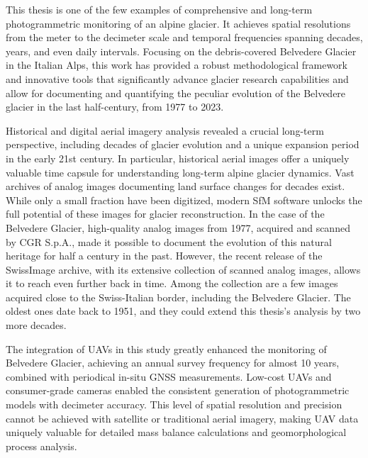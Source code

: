 This thesis is one of the few examples of comprehensive and long-term photogrammetric monitoring of an alpine glacier. 
It achieves spatial resolutions from the meter to the decimeter scale and temporal frequencies spanning decades, years, and even daily intervals.
Focusing on the debris-covered Belvedere Glacier in the Italian Alps, this work has provided a robust methodological framework and innovative tools that significantly advance glacier research capabilities and allow for documenting and quantifying the peculiar evolution of the Belvedere glacier in the last half-century, from 1977 to 2023.

Historical and digital aerial imagery analysis revealed a crucial long-term perspective, including decades of glacier evolution and a unique expansion period in the early 21st century. 
In particular, historical aerial images offer a uniquely valuable time capsule for understanding long-term alpine glacier dynamics.  
Vast archives of analog images documenting land surface changes for decades exist.  
While only a small fraction have been digitized, modern SfM software unlocks the full potential of these images for glacier reconstruction. 
In the case of the Belvedere Glacier, high-quality analog images from 1977, acquired and scanned by CGR S.p.A., made it possible to document the evolution of this natural heritage for half a century in the past. 
However, the recent release of the SwissImage archive, with its extensive collection of scanned analog images, allows it to reach even further back in time. 
Among the collection are a few images acquired close to the Swiss-Italian border, including the Belvedere Glacier. 
The oldest ones date back to 1951, and they could extend this thesis's analysis by two more decades.

The integration of UAVs in this study greatly enhanced the monitoring of Belvedere Glacier, achieving an annual survey frequency for almost 10 years, combined with periodical in-situ GNSS measurements. 
Low-cost UAVs and consumer-grade cameras enabled the consistent generation of photogrammetric models with decimeter accuracy. 
This level of spatial resolution and precision cannot be achieved with satellite or traditional aerial imagery, making UAV data uniquely valuable for detailed mass balance calculations and geomorphological process analysis.

